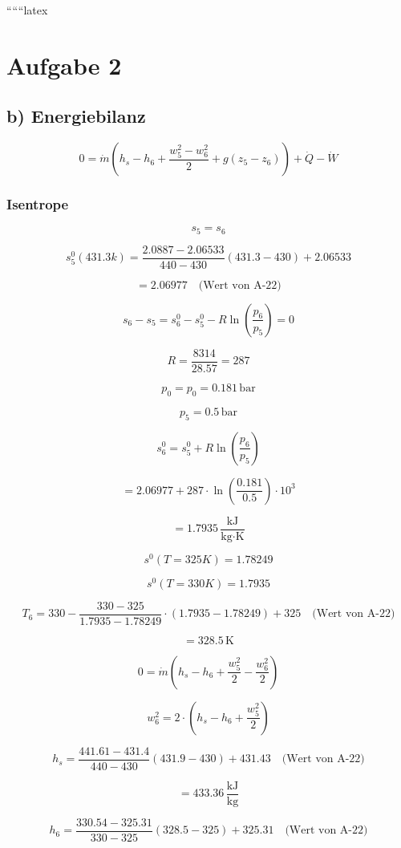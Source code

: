 ``````latex


\section*{Aufgabe 2}

\subsection*{b) Energiebilanz}

\[
0 = \dot{m} (h_s - h_6 + \frac{w_5^2 - w_6^2}{2} + g(z_5 - z_6)) + \dot{Q} - \dot{W}
\]

\subsubsection*{Isentrope}

\[
s_5 = s_6
\]

\[
s_5^0 (431.3 k) = \frac{2.0887 - 2.06533}{440 - 430} (431.3 - 430) + 2.06533
\]

\[
= 2.06977 \quad \text{(Wert von A-22)}
\]

\[
s_6 - s_5 = s_6^0 - s_5^0 - R \ln \left( \frac{p_6}{p_5} \right) = 0
\]

\[
R = \frac{8314}{28.57} = 287
\]

\[
p_0 = p_0 = 0.181 \, \text{bar}
\]

\[
p_5 = 0.5 \, \text{bar}
\]

\[
s_6^0 = s_5^0 + R \ln \left( \frac{p_6}{p_5} \right)
\]

\[
= 2.06977 + 287 \cdot \ln \left( \frac{0.181}{0.5} \right) \cdot 10^3
\]

\[
= 1.7935 \, \frac{\text{kJ}}{\text{kg} \cdot \text{K}}
\]

\[
s^0 (T = 325 K) = 1.78249
\]

\[
s^0 (T = 330 K) = 1.7935
\]

\[
T_6 = 330 - \frac{330 - 325}{1.7935 - 1.78249} \cdot (1.7935 - 1.78249) + 325 \quad \text{(Wert von A-22)}
\]

\[
= 328.5 \, \text{K}
\]

\[
0 = \dot{m} (h_s - h_6 + \frac{w_5^2}{2} - \frac{w_6^2}{2})
\]

\[
w_6^2 = 2 \cdot (h_s - h_6 + \frac{w_5^2}{2})
\]

\[
h_s = \frac{441.61 - 431.4}{440 - 430} (431.9 - 430) + 431.43 \quad \text{(Wert von A-22)}
\]

\[
= 433.36 \, \frac{\text{kJ}}{\text{kg}}
\]

\[
h_6 = \frac{330.54 - 325.31}{330 - 325} (328.5 - 325) + 325.31 \quad \text{(Wert von A-22)}
\]

